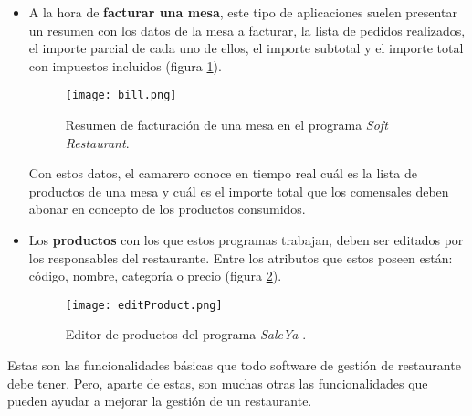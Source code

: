 \begin{itemize}
    \item A la hora de \textbf{facturar una mesa}, este tipo de aplicaciones 
    suelen presentar un resumen con los datos de la mesa a facturar, la lista 
    de pedidos realizados, el importe parcial de cada uno de ellos, el importe
    subtotal y el importe total con impuestos incluidos (figura
    \ref{fig:bill}).

    \begin{figure}[!h]
      \begin{center}
        \texttt{[image: bill.png]}
        \caption{Resumen de facturación de una mesa en el programa
        \emph{Soft Restaurant}\cite{bib:softRestaurant}.}
        \label{fig:bill}
      \end{center}
    \end{figure}

    Con estos datos, el camarero conoce en tiempo real cuál es la lista de
    productos de una mesa y cuál es el importe total que los comensales deben
    abonar en concepto de los productos consumidos.

    \item Los \textbf{productos} con los que estos programas trabajan, deben 
    ser editados por los responsables del restaurante. Entre los atributos que
    estos poseen están: código, nombre, categoría o precio (figura
    \ref{fig:editProduct}).

    \begin{figure}[!h]
      \begin{center}
        \texttt{[image: editProduct.png]}
        \caption{Editor de productos del programa \emph{SaleYa}
        \cite{bib:saleYa}.}
        \label{fig:editProduct}
      \end{center}
    \end{figure}
    \end{itemize}

    Estas son las funcionalidades básicas que todo software de 
    gestión de restaurante debe tener. Pero, aparte de estas, son muchas otras 
    las funcionalidades que pueden ayudar a mejorar la gestión de un 
    restaurante.


